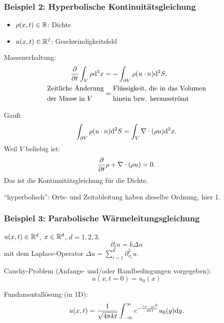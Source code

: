 \subsubsection*{Beispiel 2: Hyperbolische Kontinuitätsgleichung}
\begin{itemize}
\item $\rho(x,t) \in \mathbb{R}$: Dichte
\item $u(x,t) \in \mathbb{R}^2$: Geschwindigkeitsfeld
\end{itemize}

Massenerhaltung:
\begin{align*}
  \frac{\partial }{\partial t} \int_V \rho \mathrm{d}^3 x
  &= - \int_{\partial V} \rho( u \cdot n ) \mathrm{d}^2 S, \\
  \begin{aligned}
    &\text{Zeitliche Änderung} \\
    &\text{der Masse in $V$}
  \end{aligned}
  &= \begin{aligned}
    &\text{Flüssigkeit, die in das Volumen} \\
    &\text{hinein bzw. herausströmt}
  \end{aligned}
\end{align*}

Gauß:
\[ \int_{\partial V} \rho(u \cdot n) \mathrm{d}^2 S
  = \int_V \nabla \cdot (\rho u) \mathrm{d}^3 x. \]
Weil $V$ beliebig ist:
\[ \frac{\partial }{\partial t} \rho + \nabla \cdot (\rho u) = 0. \]
Das ist die Kontinuitätsgleichung für die Dichte.

``hyperbolisch'': Orts- und Zeitableitung haben dieselbe Ordnung, hier 1.

\subsubsection*{Beispiel 3: Parabolische Wärmeleitungsgleichung}
$u(x,t) \in \mathbb{R}^d$, $x \in \mathbb{R}^d$, $d = 1,2,3$.
\[ \partial_t u = k \Delta u \]
mit dem Laplace-Operator $\Delta u = \sum_{i=1}^d \partial_{x_i}^2 u$.

Cauchy-Problem (Anfangs- und/oder Randbedingungen vorgegeben):
\[ u(x, t = 0) = u_0(x) \]

Fundamentallösung (in 1D):
\[ u(x,t) = \frac{1}{\sqrt{4\pi k t}} \int_{-\infty}^\infty
  e^{-\frac{(x-y)^2}{4 k t}} u_0(y) \mathrm{d} y. \]

